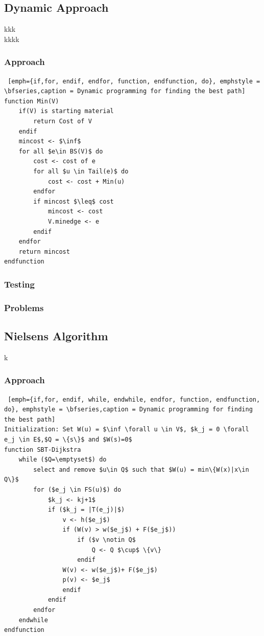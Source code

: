 \documentclass[a4paper,10pt,titlepage]{paper}
\begin{document}
\subsection{Dynamic Approach}
kkk \cite{Carsten}\\
kkkk \cite{Fagerberg}\\

\subsubsection{Approach}
\begin{lstlisting} [emph={if,for, endif, endfor, function, endfunction, do}, emphstyle = \bfseries,caption = Dynamic programming for finding the best path]
function Min(V)
	if(V) is starting material 
		return Cost of V
	endif
	mincost <- $\inf$
	for all $e\in BS(V)$ do
		cost <- cost of e
		for all $u \in Tail(e)$ do
			cost <- cost + Min(u)
		endfor
		if mincost $\leq$ cost 
			mincost <- cost
			V.minedge <- e
		endif
	endfor
	return mincost
endfunction
\end{lstlisting}
\subsubsection{Testing}
\subsubsection{Problems}

\subsection{Nielsens Algorithm}
k \cite{Nielsen}
\subsubsection{Approach}
\begin{lstlisting} [emph={if,for, endif, while, endwhile, endfor, function, endfunction, do}, emphstyle = \bfseries,caption = Dynamic programming for finding the best path]
Initialization: Set W(u) = $\inf \forall u \in V$, $k_j = 0 \forall e_j \in E$,$Q = \{s\}$ and $W(s)=0$
function SBT-Dijkstra
	while ($Q=\emptyset$) do
		select and remove $u\in Q$ such that $W(u) = min\{W(x)|x\in Q\}$
		for ($e_j \in FS(u)$) do
			$k_j <- kj+1$
			if ($k_j = |T(e_j)|$) 
				v <- h($e_j$)
				if (W(v) > w($e_j$) + F($e_j$))
					if ($v \notin Q$  
						Q <- Q $\cup$ \{v\}
					endif
				W(v) <- w($e_j$)+ F($e_j$)
				p(v) <- $e_j$
				endif
			endif
		endfor
	endwhile
endfunction
\end{lstlisting}
\end{document}
